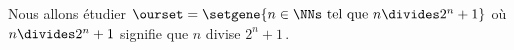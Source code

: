 Nous allons étudier 
$\ourset = \setgene{n \in \NNs \text{ tel que } n \divides 2^n + 1}$
où $n \divides 2^n + 1$ signifie que $n$ divise $2^n + 1$\,.